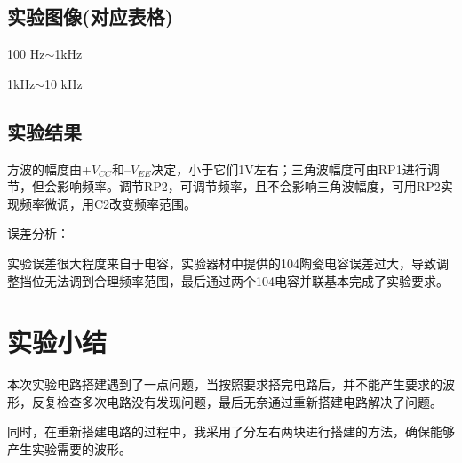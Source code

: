 \documentclass[a4paper,11pt,UTF8]{article}
\numberwithin{equation}{subsection}
\begin{document}
\subsection{实验图像(对应表格)}
100 Hz$\sim$1kHz

\begin{figure}[H]
	\centering
\end{figure}
1kHz$\sim$10 kHz
\begin{figure}[H]
	\centering
\end{figure}
\subsection{实验结果}
方波的幅度由+$V_{CC}$和–$V_{EE}$决定，小于它们1V左右；三角波幅度可由RP1进行调节，但会影响频率。调节RP2，可调节频率，且不会影响三角波幅度，可用RP2实现频率微调，用C2改变频率范围。

误差分析：

实验误差很大程度来自于电容，实验器材中提供的104陶瓷电容误差过大，导致调整挡位无法调到合理频率范围，最后通过两个104电容并联基本完成了实验要求。
\section{实验小结}
本次实验电路搭建遇到了一点问题，当按照要求搭完电路后，并不能产生要求的波形，反复检查多次电路没有发现问题，最后无奈通过重新搭建电路解决了问题。

同时，在重新搭建电路的过程中，我采用了分左右两块进行搭建的方法，确保能够产生实验需要的波形。
\end{document}
